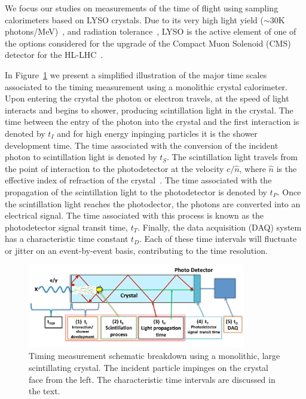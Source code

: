 \documentclass[12pt]{article}
\begin{document}
{We focus our studies on measurements of the time of flight using sampling calorimeters 
based on LYSO crystals. Due to its very high light yield ($\sim 30$K photons/MeV)~\cite{LYSOProperties}, and
radiation tolerance~\cite{5402126, 4291695, 5402125, Dissertori:2013rma}, LYSO
is the active element of one of the options considered for the upgrade of the
Compact Muon Solenoid (CMS) detector for the HL-LHC~\cite{Contardo:1605208}. 

In Figure~\ref{fig:ScintillatorTiming} we present a simplified illustration of
the major time scales associated to the timing measurement using a monolithic
crystal calorimeter. Upon entering the crystal the photon or electron travels,
at the speed of light interacts and begins to shower, producing scintillation light in the crystal. 
The time between the entry of the photon into the crystal and the first interaction is denoted by
$t_I$ and for high energy inpinging particles it is the shower development time. 
The time associated with the conversion of the incident photon to
scintillation light is denoted by $t_S$. The scintillation light travels from
the point of interaction to the photodetector at the velocity $c/\hat{n}$, where
$\hat{n}$ is the effective index of refraction of the crystal~\cite{Moses}. The
time associated with the propagation of the scintillation light to the photodetector 
is denoted by $t_P$. Once the scintillation light reaches the photodector, the  photons are converted into an
electrical signal. The time associated with this process is known as the
photodetector signal transit time, $t_T$. Finally, the data acquisition (DAQ)
system has a characteristic time constant $t_D$. Each of these time intervals will fluctuate or jitter on an event-by-event basis, contributing to the time resolution.


\begin{figure}[h] \centering
\includegraphics[width=0.85\textwidth]{figs/ScintillatorTiming_v3}
\caption{Timing measurement schematic breakdown using a monolithic, large scintillating crystal. 
The incident particle impinges on the crystal face from the left. The characteristic time intervals  are discussed 
in the text.}
\label{fig:ScintillatorTiming}
\end{figure}


}
\end{document}
